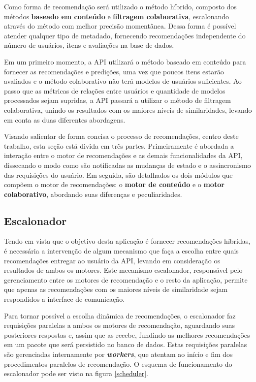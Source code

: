\documentclass[12pt, openright, oneside, a4paper, brazil]{abntex2}
\begin{document}
Como forma de recomendação será utilizado o método híbrido, composto dos métodos \textbf{baseado em conteúdo} e \textbf{filtragem colaborativa}, escalonando através do método com melhor precisão momentânea. Dessa forma é possível atender qualquer tipo de metadado, fornecendo recomendações independente do número de usuários, itens e avaliações na base de dados.

Em um primeiro momento, a API utilizará o método baseado em conteúdo para fornecer as recomendações e predições, uma vez que poucos itens estarão avaliados e o método colaborativo não terá modelos de usuários suficientes. Ao passo que as métricas de relações entre usuários e quantidade de modelos processados sejam supridas, a API passará a utilizar o método de filtragem colaborativa, unindo os resultados com os maiores níveis de similaridades, levando em conta as duas diferentes abordagens.

Visando salientar de forma concisa o processo de recomendações, centro deste trabalho, esta seção está divida em três partes. Primeiramente é abordada a interação entre o motor de recomendações e as demais funcionalidades da API, dissecando o modo como são notificadas as mudanças de estado e o assincronismo das requisições do usuário. Em seguida, são detalhados os dois módulos que compõem o motor de recomendações: o \textbf{motor de conteúdo} e o \textbf{motor colaborativo}, abordando suas diferenças e peculiaridades.

\subsection{Escalonador} \label{motor:async}

Tendo em vista que o objetivo desta aplicação é fornecer recomendações híbridas, é necessária a intervenção de algum mecanismo que faça a escolha entre quais recomendações entregar ao usuário da API, levando em consideração os resultados de ambos os motores. Este mecanismo escalonador, responsável pelo gerenciamento entre os motores de recomendação e o resto da aplicação, permite que apenas as recomendações com os maiores níveis de similaridade sejam respondidos a interface de comunicação.

Para tornar possível a escolha dinâmica de recomendações, o escalonador faz requisições paralelas a ambos os motores de recomendação, aguardando suas posteriores respostas e, assim que as recebe, fundindo as melhores recomendações em um pacote que será persistido no banco de dados. Estas requisições paralelas são gerenciadas internamente por \textit{\textbf{workers}}, que atentam ao início e fim dos procedimentos paralelos de recomendação. O esquema de funcionamento do escalonador pode ser visto na figura \ref{scheduler}.
\end{document}
